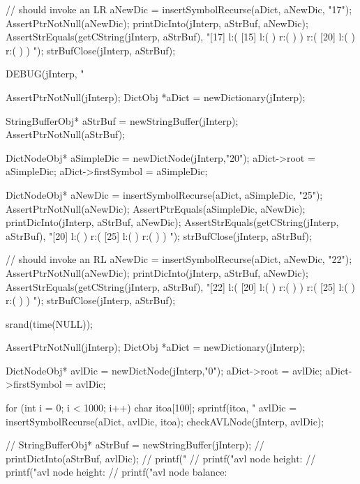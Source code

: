   // should invoke an LR
  aNewDic = insertSymbolRecurse(aDict, aNewDic, "17");
  AssertPtrNotNull(aNewDic);
  printDicInto(jInterp, aStrBuf, aNewDic);
  AssertStrEquals(getCString(jInterp, aStrBuf),
  "[17] l:( [15] l:(  ) r:(  )  ) r:( [20] l:(  ) r:(  )  ) ");
  strBufClose(jInterp, aStrBuf);
\stopCTest
\stopTestCase


\startCTest
  DEBUG(jInterp, "\n%

  AssertPtrNotNull(jInterp);
  DictObj *aDict = newDictionary(jInterp);

  StringBufferObj* aStrBuf = newStringBuffer(jInterp);
  AssertPtrNotNull(aStrBuf);
  
  DictNodeObj* aSimpleDic = newDictNode(jInterp,"20");
  aDict->root             = aSimpleDic;
  aDict->firstSymbol      = aSimpleDic;

  DictNodeObj* aNewDic = insertSymbolRecurse(aDict, aSimpleDic, "25");
  AssertPtrNotNull(aNewDic);
  AssertPtrEquals(aSimpleDic, aNewDic);
  printDicInto(jInterp, aStrBuf, aNewDic);
  AssertStrEquals(getCString(jInterp, aStrBuf),
  "[20] l:(  ) r:( [25] l:(  ) r:(  )  ) ");
  strBufClose(jInterp, aStrBuf);
  
  // should invoke an RL
  aNewDic = insertSymbolRecurse(aDict, aNewDic, "22");
  AssertPtrNotNull(aNewDic);
  printDicInto(jInterp, aStrBuf, aNewDic);
  AssertStrEquals(getCString(jInterp, aStrBuf),
  "[22] l:( [20] l:(  ) r:(  )  ) r:( [25] l:(  ) r:(  )  ) ");
  strBufClose(jInterp, aStrBuf);
\stopCTest
\stopTestCase

\startCTest

  srand(time(NULL));

  AssertPtrNotNull(jInterp);
  DictObj *aDict = newDictionary(jInterp);

  DictNodeObj* avlDic = newDictNode(jInterp,"0");
  aDict->root         = avlDic;
  aDict->firstSymbol  = avlDic;

  for (int i = 0; i < 1000; i++) {
    char itoa[100];
    sprintf(itoa, "%
    avlDic = insertSymbolRecurse(aDict, avlDic, itoa);
  }
  checkAVLNode(jInterp, avlDic);

//  StringBufferObj* aStrBuf = newStringBuffer(jInterp);
//  printDictInto(aStrBuf, avlDic);
//  printf("%
//  printf("avl node height: %
//  printf("avl node height: %
//  printf("avl node balance: %
\stopCTest
\stopTestCase

